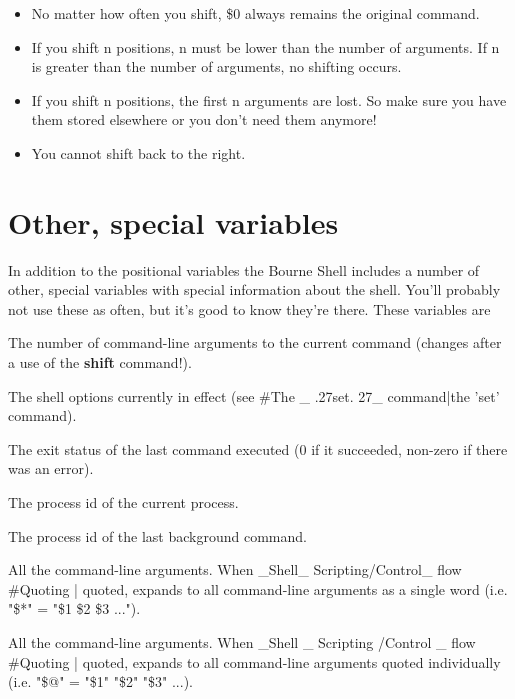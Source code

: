 \begin{itemize}
\setlength{\leftmargin}{0pt}
\setlength{\itemsep}{0pt}
\setlength{\parsep}{0pt}
\setlength{\parskip}{0pt}
\item No matter how often you shift, \$0 always remains the original command.
\item If you shift n positions, n must be lower than the number of arguments.
If n is greater than the number of arguments, no shifting occurs.
\item If you shift n positions, the first n arguments are lost. So make sure
you have them stored elsewhere or you don't need them anymore!
\item You cannot shift back to the right.
\end{itemize}

\section{Other, special variables}
In addition to the positional variables the Bourne Shell includes a number of
other, special variables with special information about the shell. You'll
probably not use these as often, but it's good to know they're there. These
variables are
\begin{description}
\setlength{\leftmargin}{0pt}
\setlength{\itemsep}{0pt}
\setlength{\parsep}{0pt}
\setlength{\parskip}{0pt}
	\item[\$\#]The number of command-line arguments to the current command (changes after a use of the \textbf{shift} command!).
	\item[\$-]The shell options currently in effect (see \#The \_ .27set. 27\_ command|the 'set' command).
	\item[\$?]The exit status of the last command executed (0 if it succeeded, non-zero if there was an error).
	\item[\$\$]The process id of the current process.
	\item[\$!]The process id of the last background command.
	\item[\$*]All the command-line arguments. When \_Shell\_ Scripting/Control\_ flow \#Quoting | quoted, expands to all command-line arguments as a single word (i.e. "\$*" = "\$1 \$2 \$3 ...").
	\item[\$@]All the command-line arguments. When \_Shell \_ Scripting /Control \_ flow \#Quoting | quoted, expands to all command-line arguments quoted individually (i.e. "\$@" = "\$1" "\$2" "\$3" ...).
\end{description}

